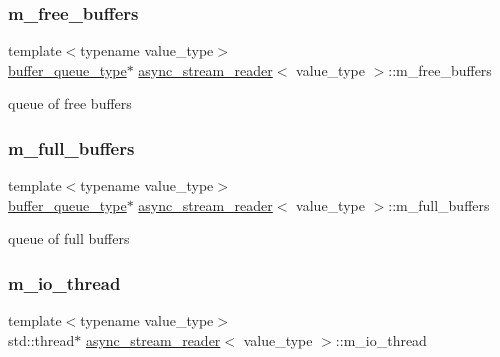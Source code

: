 \subsubsection{\texorpdfstring{m\+\_\+free\+\_\+buffers}{m\_free\_buffers}}
{\footnotesize\ttfamily template$<$typename value\+\_\+type$>$ \\
\hyperlink{classasync__stream__reader_a5301e887b098a0ade898265ca6935d68}{buffer\+\_\+queue\+\_\+type}$\ast$ \hyperlink{classasync__stream__reader}{async\+\_\+stream\+\_\+reader}$<$ value\+\_\+type $>$\+::m\+\_\+free\+\_\+buffers\hspace{0.3cm}{\ttfamily [private]}}



queue of free buffers 

\mbox{\label{classasync__stream__reader_a5713212cfddf2a29459e70a8d2852a44}} 
\subsubsection{\texorpdfstring{m\+\_\+full\+\_\+buffers}{m\_full\_buffers}}
{\footnotesize\ttfamily template$<$typename value\+\_\+type$>$ \\
\hyperlink{classasync__stream__reader_a5301e887b098a0ade898265ca6935d68}{buffer\+\_\+queue\+\_\+type}$\ast$ \hyperlink{classasync__stream__reader}{async\+\_\+stream\+\_\+reader}$<$ value\+\_\+type $>$\+::m\+\_\+full\+\_\+buffers\hspace{0.3cm}{\ttfamily [private]}}



queue of full buffers 

\mbox{\label{classasync__stream__reader_a50b44a356f5c742f20d7ea31bebc018e}} 
\subsubsection{\texorpdfstring{m\+\_\+io\+\_\+thread}{m\_io\_thread}}
{\footnotesize\ttfamily template$<$typename value\+\_\+type$>$ \\
std\+::thread$\ast$ \hyperlink{classasync__stream__reader}{async\+\_\+stream\+\_\+reader}$<$ value\+\_\+type $>$\+::m\+\_\+io\+\_\+thread\hspace{0.3cm}{\ttfamily [private]}}



